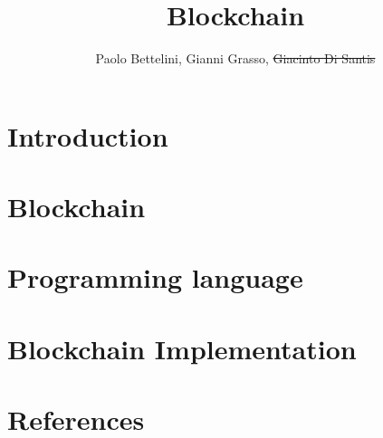 \documentclass{article}
\title{Blockchain}
\author{Paolo Bettelini, Gianni Grasso, \sout{Giacinto Di Santis}}
\date{}
\begin{document}
\maketitle
\tableofcontents
\pagebreak

\section{Introduction}



\pagebreak

\section{Blockchain}



\pagebreak

\section{Programming language}



\pagebreak

\section{Blockchain Implementation}



\pagebreak

\section{References}


\end{document}
